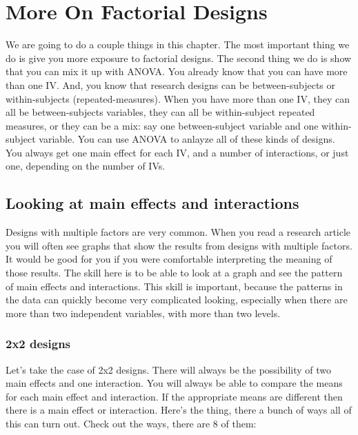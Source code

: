 \documentclass[
]{book}
\begin{document}
\chapter{More On Factorial Designs}\label{more-on-factorial-designs}

We are going to do a couple things in this chapter. The most important thing we do is give you more exposure to factorial designs. The second thing we do is show that you can mix it up with ANOVA. You already know that you can have more than one IV. And, you know that research designs can be between-subjects or within-subjects (repeated-measures). When you have more than one IV, they can all be between-subjects variables, they can all be within-subject repeated measures, or they can be a mix: say one between-subject variable and one within-subject variable. You can use ANOVA to anlayze all of these kinds of designs. You always get one main effect for each IV, and a number of interactions, or just one, depending on the number of IVs.

\section{Looking at main effects and interactions}\label{looking-at-main-effects-and-interactions}

Designs with multiple factors are very common. When you read a research article you will often see graphs that show the results from designs with multiple factors. It would be good for you if you were comfortable interpreting the meaning of those results. The skill here is to be able to look at a graph and see the pattern of main effects and interactions. This skill is important, because the patterns in the data can quickly become very complicated looking, especially when there are more than two independent variables, with more than two levels.

\subsection{2x2 designs}\label{x2-designs-1}

Let's take the case of 2x2 designs. There will always be the possibility of two main effects and one interaction. You will always be able to compare the means for each main effect and interaction. If the appropriate means are different then there is a main effect or interaction. Here's the thing, there a bunch of ways all of this can turn out. Check out the ways, there are 8 of them:
\end{document}

